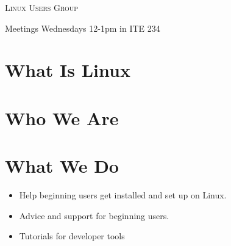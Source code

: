 \documentclass[11pt]{article}
\begin{document}
\begin{multicols*}{2}

\begin{center} \scshape \Huge
    \phantom{x}
    Linux Users Group
\end{center}

\begin{center} \Large
    Meetings
    Wednesdays 12-1pm in ITE 234
\end{center}

\section*{What Is Linux}


\section*{Who We Are}


\section*{What We Do}


\begin{itemize} \large
\item Help beginning users get installed and set up on Linux.
\item Advice and support for beginning users.
\item Tutorials for developer tools
\end{itemize}




\end{multicols*}
\end{document}
